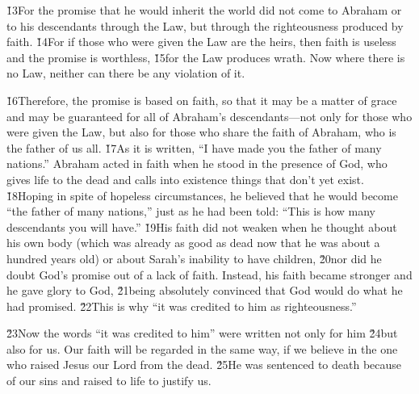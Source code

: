 \v{13}For the promise that he would inherit the world did not come to Abraham or to his descendants through the Law, but through the righteousness produced by faith. \v{14}For if those who were given the Law are the heirs, then faith is useless and the promise is worthless, \v{15}for the Law produces wrath. Now where there is no Law, neither can there be any violation of it.

\v{16}Therefore, the promise is based on faith, so that it may be a matter of grace and may be guaranteed for all of Abraham's descendants---not only for those who were given the Law, but also for those who share the faith of Abraham, who is the father of us all. \v{17}As it is written, ``I have made you the father of many nations.'' Abraham acted in faith when he stood in the presence of God, who gives life to the dead and calls into existence things that don't yet exist. \v{18}Hoping in spite of hopeless circumstances, he believed that he would become ``the father of many nations,'' just as he had been told: ``This is how many descendants you will have.'' \v{19}His faith did not weaken when he thought about his own body (which was already as good as dead now that he was about a hundred years old) or about Sarah's inability to have children, \v{20}nor did he doubt God's promise out of a lack of faith. Instead, his faith became stronger and he gave glory to God, \v{21}being absolutely convinced that God would do what he had promised. \v{22}This is why ``it was credited to him as righteousness.''

\v{23}Now the words ``it was credited to him'' were written not only for him \v{24}but also for us. Our faith will be regarded in the same way, if we believe in the one who raised Jesus our Lord from the dead. \v{25}He was sentenced to death because of our sins and raised to life to justify us.

